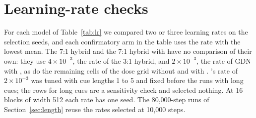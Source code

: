 \begin{table}[!htb]
\centering
\footnotesize

\caption{Loss per seed at 164M training tokens (10,000 steps), for the comparisons of
Table~\ref{tab:confirm} and Appendix~\ref{sec:cues}. The last row is the mean over seeds after
mixing each model with the n-gram cache.}
\label{tab:seeds164}
\end{table}

\begin{table}[!htb]
\centering
\footnotesize

\caption{Loss per seed for the longer runs of Table~\ref{tab:confirm}.
The third size ran on seeds 20--23 only.}
\label{tab:seedslong}
\end{table}

\begin{table}[!htb]
\centering
\small

\caption{Seed-mean loss on the dose grid of Figure~\ref{fig:grid} (seeds 0 and 1). Cells with
$P = 0$ train at learning rate $4 \times 10^{-3}$ and cells with $P \ge 1$ at $2 \times 10^{-3}$
(Table~\ref{tab:lr}).}
\label{tab:grid}
\end{table}

\begin{table}[!htb]
\centering
\footnotesize

\caption{Loss on the dose grid, seed 0 / seed 1 (means in Table~\ref{tab:grid}).}
\label{tab:gridseeds}
\end{table}

\begin{table}[!htb]
\centering
\small

\caption{Loss by cue set for GDN with \ingram{} ($P = 1$, 8 blocks of width 256, 164M
tokens), seeds 0 and 1 (exploratory; used to select the cue set, Appendix~\ref{sec:cues}). Each cue
length adds one table of $2^{16}$ rows of width 64. The last column interpolates the model with
the n-gram cache.}
\label{tab:cues}
\end{table}

\section{Learning-rate checks}
\label{app:lr}

For each model of Table~\ref{tab:lr} we compared two or three learning rates on the selection
seeds, and each confirmatory arm in the table uses the rate with the lowest mean. The 7:1 hybrid
and the 7:1 hybrid with \ingram{} have no comparison of their own: they use
$4 \times 10^{-3}$, the rate of the 3:1 hybrid, and $2 \times 10^{-3}$, the rate of GDN with
\ingram{}, as do the remaining cells of the dose grid without and with \ingram{}.
\ingram{}'s rate of $2 \times 10^{-3}$ was tuned with cue lengths 1 to 5 and fixed before the runs
with long cues; the rows for long cues are a sensitivity check and selected nothing. At 16 blocks
of width 512 each rate has one seed. The 80,000-step runs of Section~\ref{sec:length} reuse the
rates selected at 10,000 steps.

